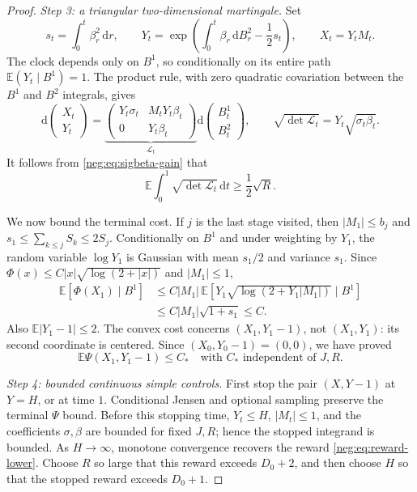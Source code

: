 \documentclass[11pt]{article}
\theoremstyle{definition}
\theoremstyle{remark}
\numberwithin{equation}{section}
\begin{document}
\begin{proof}
\emph{Step 3: a triangular two-dimensional martingale.}
Set
\[
 s_t=\int_0^t\beta_r^2\,\mathrm dr,
 \qquad Y_t=\exp\!\left(\int_0^t\beta_r\,\mathrm dB_r^2-\frac12s_t\right),
 \qquad X_t=Y_tM_t.
\]
The clock depends only on $B^1$, so conditionally on its entire path
$\mathbb E(Y_t\mid B^1)=1$. The product rule, with zero quadratic
covariation between the $B^1$ and $B^2$ integrals, gives
\begin{equation}\label{neg:eq:L-martingale}
 \mathrm d\begin{pmatrix}X_t\\Y_t\end{pmatrix}
 =\underbrace{\begin{pmatrix}
  Y_t\sigma_t&M_tY_t\beta_t\\0&Y_t\beta_t
 \end{pmatrix}}_{\mathcal L_t}
 \mathrm d\begin{pmatrix}B_t^1\\B_t^2\end{pmatrix},
 \qquad \sqrt{\det\mathcal L_t}
       =Y_t\sqrt{\sigma_t\beta_t}.
\end{equation}
It follows from \eqref{neg:eq:sigbeta-gain} that
\begin{equation}\label{neg:eq:reward-lower}
 \mathbb E\int_0^1\sqrt{\det\mathcal L_t}\,\mathrm dt
 \ge\frac12\sqrt R.
\end{equation}

We now bound the terminal cost. If $j$ is the last stage visited, then
$|M_1|\le b_j$ and $s_1\le\sum_{k\le j}S_k\le2S_j$. Conditionally on
$B^1$ and under weighting by $Y_1$, the random variable $\log Y_1$ is
Gaussian with mean $s_1/2$ and variance $s_1$. Since
$\Phi(x)\le C|x|\sqrt{\log(2+|x|)}$ and $|M_1|\le1$,
\begin{equation}\label{neg:eq:terminal-cost}
 \begin{aligned}
 \mathbb E[\Phi(X_1)\mid B^1]
 &\le C|M_1|\,\mathbb E\!
    \left[Y_1\sqrt{\log(2+Y_1|M_1|)}\mid B^1\right]\\
 &\le C|M_1|\sqrt{1+s_1}\le C.
 \end{aligned}
\end{equation}
Also $\mathbb E|Y_1-1|\le2$. The convex cost concerns $(X_1,Y_1-1)$,
not $(X_1,Y_1)$: its second coordinate is centered. Since
$(X_0,Y_0-1)=(0,0)$, we have proved
\[
 \mathbb E\Psi(X_1,Y_1-1)\le C_*
 \quad\text{with $C_*$ independent of $J,R$.}
\]

\emph{Step 4: bounded continuous simple controls.}
First stop the pair $(X,Y-1)$ at $Y=H$, or at time $1$. Conditional
Jensen and optional sampling preserve the terminal $\Psi$ bound.
Before this stopping time, $Y_t\le H$, $|M_t|\le1$,
and the coefficients $\sigma,\beta$ are bounded for fixed
$J,R$; hence the stopped integrand is bounded. As $H\to\infty$,
monotone convergence recovers the reward \eqref{neg:eq:reward-lower}.
Choose $R$ so large that this reward exceeds $D_0+2$, and then choose
$H$ so that the stopped reward exceeds $D_0+1$.


\end{proof}
\end{document}
